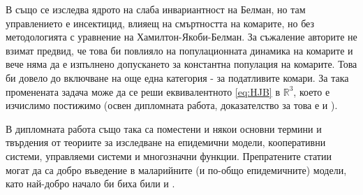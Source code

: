 В \cite{DeLara2016} също се изследва ядрото на слаба инвариантност на Белман, но там управлението е инсектицид, влияещ на смъртността на комарите, но без методологията \cite{Zidani2013} с уравнение на Хамилтон-Якоби-Белман.
За съжаление авторите не взимат предвид, че това би повлияло на популационната динамика на комарите и вече няма да е изпълнено допускането за константна популация на комарите.
Това би довело до включване на още една категория - за податливите комари.
За така променената задача може да се реши еквивалентното \eqref{eq:HJB} в $\mathbb{R}^3$, което е изчислимо постижимо (освен дипломната работа, доказателство за това е и \cite{Rashkov2021}).

В дипломната работа също така са поместени и някои основни термини и твърдения от теориите за изследване на епидемични модели, кооперативни системи, управляеми системи и многозначни функции.
Препратените статии могат да са добро въведение в маларийните (и по-общо епидемичните) модели, като най-добро начало би биха били \cite{Capasso2008} и \cite{Smith2012}.

